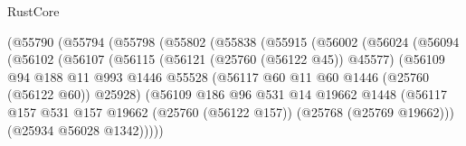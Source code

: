 \begin{lexlean}{RustCore}
\begin{coremodule}
                                (@55790
                                  (@55794
                                    (@55798
                                      (@55802
                                        (@55838
                                          (@55915
                                            (@56002
                                              (@56024
                                                (@56094
                                                  (@56102
                                                    (@56107
                                                      (@56115
                                                        (@56121 (@25760 (@56122 @45)) @45577)
                                                        (@56109
                                                          @94
                                                          @188
                                                          @11
                                                          @993
                                                          @1446
                                                          @55528
                                                          (@56117
                                                            @60
                                                            @11
                                                            @60
                                                            @1446
                                                            (@25760 (@56122 @60))
                                                            @25928)
                                                          (@56109
                                                            @186
                                                            @96
                                                            @531
                                                            @14
                                                            @19662
                                                            @1448
                                                            (@56117
                                                              @157
                                                              @531
                                                              @157
                                                              @19662
                                                              (@25760 (@56122 @157))
                                                              (@25768 (@25769 @19662)))
                                                            (@25934 @56028 @1342)))))

\end{coremodule}
\end{lexlean}
